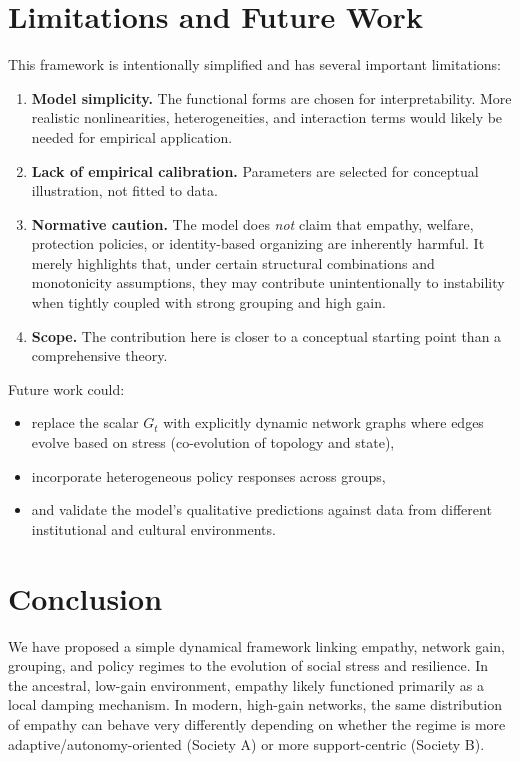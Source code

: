 \documentclass[11pt]{article}
\theoremstyle{plain}
\begin{document}
\section{Limitations and Future Work}

This framework is intentionally simplified and has several important limitations:

\begin{enumerate}
  \item \textbf{Model simplicity.}  
  The functional forms are chosen for interpretability. More realistic nonlinearities, heterogeneities, and interaction terms would likely be needed for empirical application.

  \item \textbf{Lack of empirical calibration.}  
  Parameters are selected for conceptual illustration, not fitted to data.

  \item \textbf{Normative caution.}  
  The model does \emph{not} claim that empathy, welfare, protection policies, or identity-based organizing are inherently harmful.
  It merely highlights that, under certain structural combinations and monotonicity assumptions, they may contribute unintentionally to instability when tightly coupled with strong grouping and high gain.

  \item \textbf{Scope.}  
  The contribution here is closer to a conceptual starting point than a comprehensive theory.
\end{enumerate}

Future work could:
\begin{itemize}
  \item replace the scalar $G_t$ with explicitly dynamic network graphs where edges evolve based on stress (co-evolution of topology and state),
  \item incorporate heterogeneous policy responses across groups,
  \item and validate the model's qualitative predictions against data from different institutional and cultural environments.
\end{itemize}

\section{Conclusion}

We have proposed a simple dynamical framework linking empathy, network gain, grouping, and policy regimes to the evolution of social stress and resilience.
In the ancestral, low-gain environment, empathy likely functioned primarily as a local damping mechanism.
In modern, high-gain networks, the same distribution of empathy can behave very differently depending on whether the regime is more adaptive/autonomy-oriented (Society A) or more support-centric (Society B).
\end{document}
